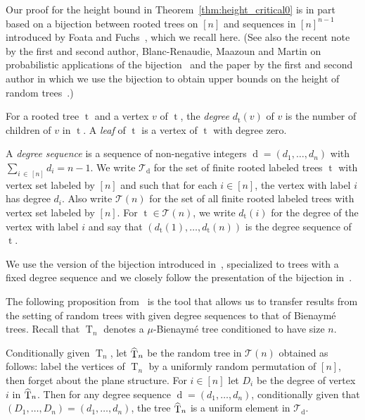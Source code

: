 \documentclass[AHL,Unicode,longabstracts,published]{cedram}
\DeclareMathOperator{\tree}{t}
\DeclareMathOperator{\rtree}{T}
\DeclareMathOperator{\dseq}{d}
\newcommand\cT{\mathcal{T}}
\let\oldhat\hat
\renewcommand*{\hat}[1]{\mathchoice{\widehat{#1}}{\widehat{#1}}{\oldhat{#1}}{\oldhat{#1}}}
\begin{document}
Our {proof for the height bound in Theorem~\ref{thm:height_critical0}} is in part based on a bijection between rooted trees on $[n]$ and sequences in $[n]^{n-1}$ introduced by Foata and Fuchs~\cite{FoataFuchs}, which we recall here. (See also the recent note by the first and second author, Blanc-Renaudie, Maazoun and Martin on probabilistic applications of the bijection~\cite{cayley_us} and the paper by the first and second author in which we use the bijection to obtain upper bounds on the height of random trees~\cite{AD22}.)

For a rooted tree $\tree$ and a vertex $v$ of $\tree$, the \emph{degree} $d_{\tree}(v)$ of $v$ is the number of children of $v$ in $\tree$. A \emph{leaf} of $\tree$ is a vertex of $\tree$ with degree zero.

A \emph{degree sequence} is a sequence of non-negative integers $\dseq=(d_1,\ldots,d_n)$ with $\sum_{i\,\in \,[n]} d_i = n-1$. We write $\cT_{\dseq}$ for the set of finite rooted labeled trees $\tree$ with vertex set labeled by $[n]$ and such that for each $i \in [n]$, the vertex with label $i$ has degree $d_i$. Also write $\cT(n)$ for the set of all finite rooted labeled trees with vertex set labeled by $[n]$. For $\tree \in \cT(n)$, we write $d_{\tree}(i)$ for the degree of the vertex with label $i$ and say that $(d_{\tree}(1),\ldots,d_{\tree}(n))$ is the degree sequence of $\tree$.

We use the version of the bijection introduced in~\cite[Section~3]{cayley_us}, specialized to trees with a fixed degree sequence and we closely follow the presentation of the bijection in~\cite{AD22}.


The following proposition from~\cite{AD22} is the tool that allows us to transfer results from the setting of random trees with given degree sequences to that of Bienaymé trees. Recall that $\rtree_n$ denotes a $\mu$-Bienaymé tree conditioned to have size $n$.

\begin{prop}[{\cite[Proposition~8]{AD22}}]\label{prop:planetrees}
Conditionally given $\rtree_{n}$, let $\hat{\rtree}_{n}$ be the random tree in $\cT(n)$ obtained as follows: label the vertices of $\rtree_{n}$ by a uniformly random permutation of $[n]$, then forget about the plane structure. For $i \in [n]$ let $D_i$ be the degree of vertex $i$ in $\hat{\rtree}_{n}$. Then for any degree sequence $\dseq=(d_1,\ldots,d_n)$, conditionally given that $(D_1,\ldots,D_n)=(d_1,\ldots,d_n)$, the tree $\hat{\rtree}_{n}$ is a uniform element in $\cT_{\dseq}$.
\end{prop}
\end{document}
